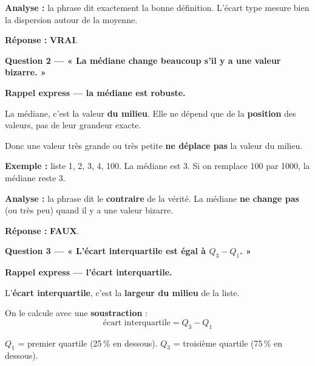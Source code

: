 \documentclass[12pt,a4paper]{article}
\begin{document}
\vspace{0.3cm}
\textbf{Analyse :} la phrase dit exactement la bonne définition. L'écart type mesure bien la dispersion autour de la moyenne.

\vspace{0.3cm}
\textbf{Réponse :} \textbf{VRAI}.

\vspace{0.5cm}

\begin{correctionbox}
\textbf{Question 2 — « La médiane change beaucoup s'il y a une valeur bizarre. »}
\end{correctionbox}

\begin{rappelcible}
\textbf{Rappel express — la médiane est robuste.}

\vspace{0.2cm}
La médiane, c'est la valeur \textbf{du milieu}. Elle ne dépend que de la \textbf{position} des valeurs, pas de leur grandeur exacte.

\vspace{0.2cm}
Donc une valeur très grande ou très petite \textbf{ne déplace pas} la valeur du milieu.

\vspace{0.2cm}
\textbf{Exemple :} liste 1, 2, 3, 4, 100. La médiane est 3. Si on remplace 100 par 1000, la médiane reste 3.
\end{rappelcible}

\vspace{0.3cm}
\textbf{Analyse :} la phrase dit le \textbf{contraire} de la vérité. La médiane \textbf{ne change pas} (ou très peu) quand il y a une valeur bizarre.

\vspace{0.3cm}
\textbf{Réponse :} \textbf{FAUX}.

\vspace{0.5cm}

\begin{correctionbox}
\textbf{Question 3 — « L'écart interquartile est égal à $Q_3 - Q_1$. »}
\end{correctionbox}

\begin{rappelcible}
\textbf{Rappel express — l'écart interquartile.}

\vspace{0.2cm}
L'\textbf{écart interquartile}, c'est la \textbf{largeur du milieu} de la liste.

\vspace{0.2cm}
On le calcule avec une \textbf{soustraction} :
\[
\text{écart interquartile} = Q_3 - Q_1
\]

\vspace{0.2cm}
$Q_1$ = premier quartile (25\,\% en dessous). $Q_3$ = troisième quartile (75\,\% en dessous).
\end{rappelcible}
\end{document}
